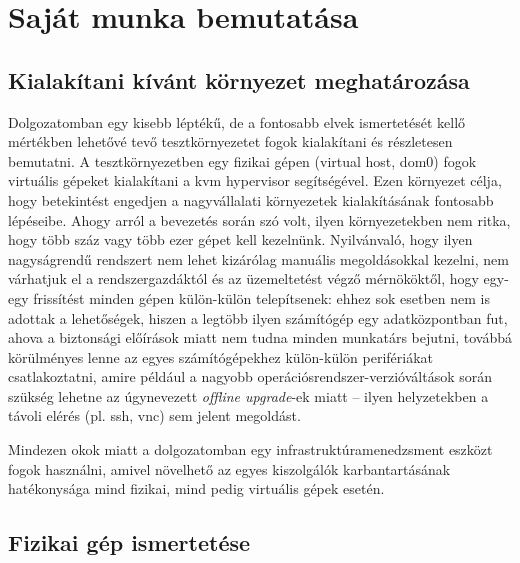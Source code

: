 
\chapter{Saját munka bemutatása}
\label{chap:testenv}

\section{Kialakítani kívánt környezet meghatározása}
Dolgozatomban egy kisebb léptékű, de a fontosabb elvek ismertetését kellő mértékben lehetővé tevő tesztkörnyezetet fogok kialakítani és részletesen bemutatni. A tesztkörnyezetben egy fizikai gépen (virtual host, dom0) fogok virtuális gépeket kialakítani a \acrshort{kvm} hypervisor segítségével. Ezen környezet célja, hogy betekintést engedjen a nagyvállalati környezetek kialakításának fontosabb lépéseibe. Ahogy arról a bevezetés során szó volt, ilyen környezetekben nem ritka, hogy több száz vagy több ezer gépet kell kezelnünk. Nyilvánvaló, hogy ilyen nagyságrendű rendszert nem lehet kizárólag manuális megoldásokkal kezelni, nem várhatjuk el a rendszergazdáktól és az üzemeltetést végző mérnököktől, hogy egy-egy frissítést minden gépen külön-külön telepítsenek: ehhez sok esetben nem is adottak a lehetőségek, hiszen a legtöbb ilyen számítógép egy adatközpontban fut, ahova a biztonsági előírások miatt nem tudna minden munkatárs bejutni, továbbá körülményes lenne az egyes számítógépekhez külön-külön perifériákat csatlakoztatni, amire például a nagyobb operációsrendszer-verzióváltások során szükség lehetne az úgynevezett \textit{offline upgrade}-ek miatt -- ilyen helyzetekben a távoli elérés (pl. \acrshort{ssh}, \acrshort{vnc}) sem jelent megoldást.

Mindezen okok miatt a dolgozatomban egy infrastruktúramenedzsment eszközt fogok használni, amivel növelhető az egyes kiszolgálók karbantartásának hatékonysága mind fizikai, mind pedig virtuális gépek esetén.

\section{Fizikai gép ismertetése}

